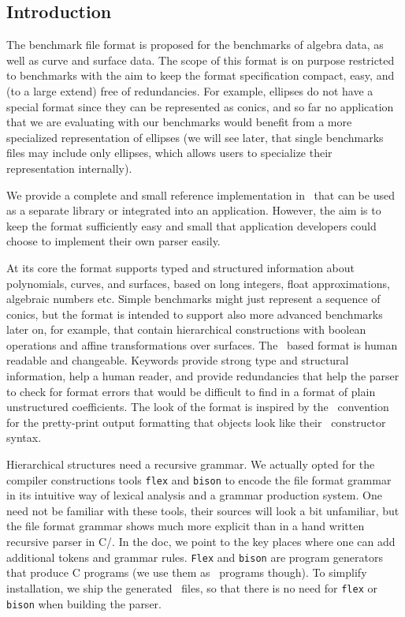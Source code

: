 \subsection{Introduction}

The benchmark file format is proposed for the benchmarks of algebra data, 
as well as curve and surface data.
The scope of this format is on purpose restricted to benchmarks with
the aim to keep the format specification compact, easy, and (to a
large extend) free of redundancies. For example, ellipses do not have
a special format since they can be represented as conics, and so far
no application that we are evaluating with our benchmarks would
benefit from a more specialized representation of ellipses (we will see 
later, that single benchmarks files may include only ellipses, which
allows users to specialize their representation internally).

We provide a complete and small reference implementation in \CC\ that
can be used as a separate library or integrated into an
application. However, the aim is to keep the format sufficiently easy
and small that application developers could choose to implement their
own parser easily.

At its core the format supports typed and structured information about
polynomials, curves, and surfaces, based on long integers, float
approximations, algebraic numbers etc. Simple benchmarks might just
represent a sequence of conics, but the format is intended to support
also more advanced benchmarks later on, for example, that contain
hierarchical constructions with boolean operations and affine
transformations over surfaces. The \ascii\ based format is human
readable and changeable. Keywords provide strong type and structural
information, help a human reader, and provide redundancies that help
the parser to check for format errors that would be difficult to find
in a format of plain unstructured coefficients. The look of the format
is inspired by the \cgal\ convention for the pretty-print output
formatting that objects look like their \CC\ constructor syntax.

Hierarchical structures need a recursive grammar. We actually opted
for the compiler constructions tools \texttt{flex} and \texttt{bison}
to encode the file format grammar in its intuitive way of lexical
analysis and a grammar production system. One need not be familiar
with these tools, their sources will look a bit unfamiliar, but the
file format grammar shows much more explicit than in a hand written
recursive parser in C/\CC.  In the doc, we point to the key places
where one can add additional tokens and grammar rules. \texttt{Flex}
and \texttt{bison} are program generators that produce C programs (we
use them as \CC\ programs though). To simplify installation, we ship
the generated \CC\ files, so that there is no need for \texttt{flex}
or \texttt{bison} when building the parser.

